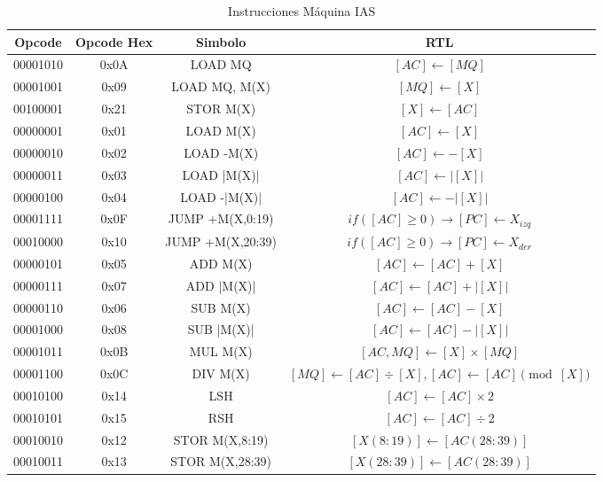 \documentclass{article}
\begin{document}
\begin{table}[htbp]
  \caption{Instrucciones Máquina IAS}
  \label{tab:tablaISA-IAS}
  \centering
  \begin{tabular}{|cccc|}
    \hline
    Opcode   & Opcode Hex &  Simbolo          & RTL \\ \hline
    00001010 & 0x0A        &  LOAD MQ          & $[AC]\leftarrow[MQ]$\\
    00001001 & 0x09        &  LOAD MQ, M(X)    & $[MQ]\leftarrow[X]$\\
    00100001 & 0x21        &  STOR M(X)        & $[X]\leftarrow[AC]$\\
    00000001 & 0x01        &  LOAD M(X)        & $[AC]\leftarrow[X]$\\
    00000010 & 0x02        &  LOAD -M(X)       & $[AC]\leftarrow-[X]$\\
    00000011 & 0x03        &  LOAD |M(X)|      & $[AC]\leftarrow|[X]|$\\
    00000100 & 0x04        &  LOAD -|M(X)|     & $[AC]\leftarrow-|[X]|$\\
    00001111 & 0x0F        &  JUMP +M(X,0:19)  & $if([AC]\ge 0) \rightarrow [PC]\leftarrow X_{izq}$\\
    00010000 & 0x10        &  JUMP +M(X,20:39) & $if([AC]\ge 0) \rightarrow [PC]\leftarrow X_{der}$\\
    00000101 & 0x05        &  ADD M(X)         & $[AC]\leftarrow[AC]+[X]$\\
    00000111 & 0x07        &  ADD |M(X)|       & $[AC]\leftarrow[AC]+|[X]|$\\
    00000110 & 0x06        &  SUB M(X)         & $[AC]\leftarrow[AC]-[X]$\\
    00001000 & 0x08        &  SUB |M(X)|       & $[AC]\leftarrow[AC]-|[X]|$\\
    00001011 & 0x0B        &  MUL M(X)         & $[AC, MQ]\leftarrow[X]\times[MQ]$\\
    00001100 & 0x0C        &  DIV M(X)         & $[MQ]\leftarrow[AC]\div[X], [AC]\leftarrow[AC]\pmod{[X]}$\\
    00010100 & 0x14        &  LSH              & $[AC]\leftarrow[AC]\times 2$\\
    00010101 & 0x15        &  RSH              & $[AC]\leftarrow[AC]\div 2$\\
    00010010 & 0x12        &  STOR M(X,8:19)   & $[X(8:19)]\leftarrow[AC(28:39)]$\\
    00010011 & 0x13        &  STOR M(X,28:39)  & $[X(28:39)]\leftarrow[AC(28:39)]$\\
    \hline
  \end{tabular}
\end{table}
\end{document}

